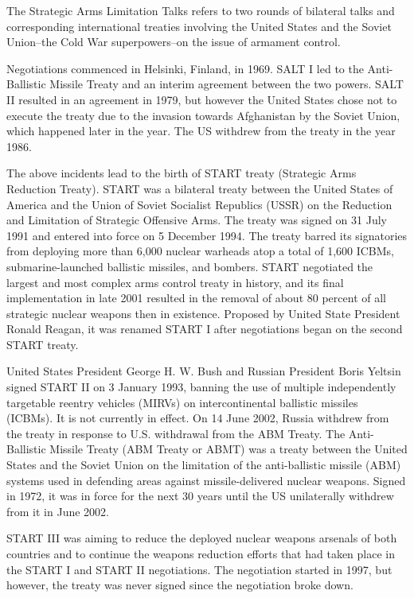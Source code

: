 \documentclass[twoside,titlepage,11pt,twocolumn,a4paper]{article}
\begin{document}
The Strategic Arms Limitation Talks refers to two rounds of bilateral 
talks and corresponding international treaties involving the United 
States and the Soviet Union--the Cold War superpowers--on the issue of 
armament control. 

Negotiations commenced in Helsinki, Finland, in 1969. SALT I led to 
the Anti-Ballistic Missile Treaty and an interim agreement between 
the two powers. \citep{burr2001} SALT II resulted in an agreement in 1979, but however 
the United States chose not to execute the treaty due to the invasion 
towards Afghanistan by the Soviet Union, which happened later in the 
year. The US withdrew from the treaty in the year 1986.

The above incidents lead to the birth of START treaty (Strategic Arms
Reduction Treaty). \citep{startI} START was a bilateral treaty between
the United States of America and the Union of Soviet Socialist
Republics (USSR) on the Reduction and Limitation of Strategic
Offensive Arms. The treaty was signed on 31 July 1991 and entered into
force on 5 December 1994.  The treaty barred its signatories from
deploying more than 6,000 nuclear warheads atop a total of 1,600
ICBMs, submarine-launched ballistic missiles, and bombers. START
negotiated the largest and most complex arms control treaty in
history, and its final implementation in late 2001 resulted in the
removal of about 80 percent of all strategic nuclear weapons then in
existence. Proposed by United State President Ronald Reagan, it was
renamed START I after negotiations began on the second START treaty.

United States President George H. W. Bush and Russian President Boris
Yeltsin signed START II on 3 January 1993, banning the use of multiple
independently targetable reentry vehicles (MIRVs) on intercontinental
ballistic missiles (ICBMs). \citep{startII} It is not currently in
effect. On 14 June 2002, Russia withdrew from the treaty in response
to U.S. withdrawal from the ABM Treaty. The Anti-Ballistic Missile
Treaty (ABM Treaty or ABMT) was a treaty between the United States and
the Soviet Union on the limitation of the anti-ballistic missile (ABM)
systems used in defending areas against missile-delivered nuclear
weapons. Signed in 1972, it was in force for the next 30 years until
the US unilaterally withdrew from it in June 2002. \citep{burr2001}

START III was aiming to reduce the deployed nuclear weapons arsenals
of both countries and to continue the weapons reduction efforts that
had taken place in the START I and START II
negotiations. \citep{startIII} The negotiation started in 1997, but
however, the treaty was never signed since the negotiation broke down.
\end{document}
